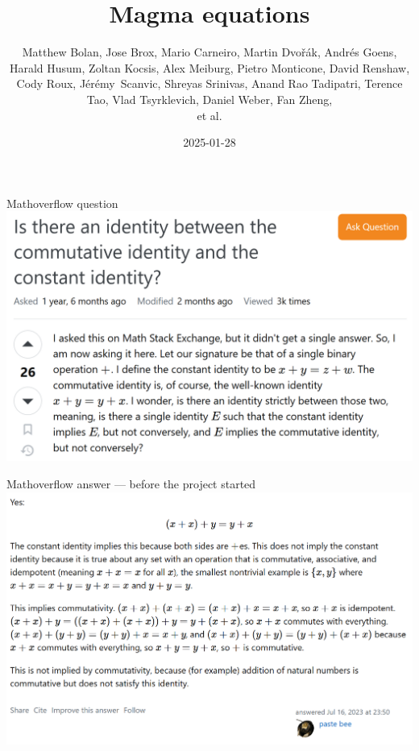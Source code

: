 \documentclass{beamer}
\title{Magma equations}
\author{Matthew Bolan, Jose Brox, Mario Carneiro, Martin Dvo\v{r}\'ak, Andr\'es Goens, Harald Husum, Zoltan Kocsis, Alex Meiburg, Pietro Monticone, David Renshaw, Cody Roux, J\'er\'emy~Scanvic, Shreyas Srinivas, Anand Rao Tadipatri, Terence Tao, Vlad Tsyrklevich, Daniel Weber, Fan Zheng,\\et al.}
\date{2025-01-28}
\begin{document}
\begin{frame}[plain]
\maketitle
\end{frame}


\begin{frame}{Mathoverflow question}
\includegraphics[width=\textwidth]{mathoverflow.png}
\end{frame}


\begin{frame}{Mathoverflow answer --- before the project started}
\includegraphics[width=\textwidth]{mathoverflow_bee.png}
\end{frame}
\end{document}
